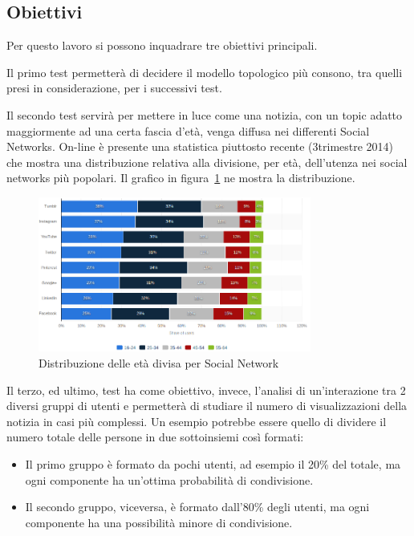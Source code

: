 \subsection{Obiettivi}
\label{section:obiettivi}

Per questo lavoro si possono inquadrare tre obiettivi principali.

Il primo test permetterà di decidere il modello topologico più consono, tra quelli 
presi in considerazione, per i successivi test.

Il secondo test servirà per mettere in luce come una notizia, 
con un topic adatto maggiormente ad una certa fascia d'età, venga diffusa nei differenti Social Networks.
On-line è presente una statistica piuttosto recente (3\degree trimestre 2014) che mostra una distribuzione 
relativa alla divisione, per età, dell’utenza nei social networks più popolari. 
Il grafico in figura~\ref{img:age_distribution_social} ne mostra la distribuzione.

\begin{figure}[!ht]
 \centerline{
  \includegraphics[width=0.8\textwidth]{img/age-distribution.png}
 }
\caption{Distribuzione delle età divisa per Social Network ~\cite{biblio:age_distribution_social}}
\label{img:age_distribution_social}
\end{figure}


Il terzo, ed ultimo, test ha come obiettivo, invece,  l'analisi di un’interazione tra 2 diversi gruppi di utenti e 
permetterà di studiare il numero di visualizzazioni della notizia in casi più complessi.
Un esempio potrebbe essere quello di dividere il numero totale delle persone in due sottoinsiemi così formati:
\begin{itemize}
 \item Il primo gruppo è formato da pochi utenti, ad esempio il 20\% del totale, ma ogni componente ha un'ottima probabilità di condivisione.
 \item Il secondo gruppo, viceversa, è formato dall'80\% degli utenti, ma ogni componente ha una possibilità minore di condivisione.
\end{itemize}





